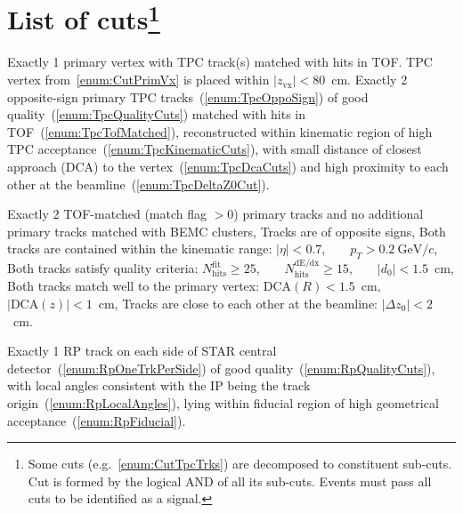 \section[List of cuts]{List of cuts\footnote{Some cuts (e.g.~\ref{enum:CutTpcTrks}) are decomposed to constituent sub-cuts. Cut is formed by the logical AND of all its sub-cuts. Events must pass all cuts to be identified as a signal.}}\label{sec:listOfCuts}
\begin{enumerate}[label=\textbf{C\arabic*},ref=C\arabic*]
 \itemm Exactly 1 primary vertex with TPC track(s) matched with hits in TOF.\label{enum:CutPrimVx}
 \itemm TPC vertex from~\ref{enum:CutPrimVx} is placed within $|z_{\text{vx}}|<80$~cm.\label{enum:CutZVx}
 \itemm Exactly 2 opposite-sign primary TPC tracks~(\ref{enum:TpcOppoSign}) of good quality~(\ref{enum:TpcQualityCuts}) matched with hits in TOF~(\ref{enum:TpcTofMatched}), reconstructed within kinematic region of high TPC acceptance~(\ref{enum:TpcKinematicCuts}), with small distance of closest approach (DCA) to the vertex~(\ref{enum:TpcDcaCuts}) and high proximity to each other at the beamline~(\ref{enum:TpcDeltaZ0Cut}).\label{enum:CutTpcTrks}
    \begin{enumerate}[label=\textbf{\theenumi.\arabic*},ref=\theenumi.\arabic*]
      \itemm Exactly 2 TOF-matched (match flag $>0$) primary tracks and no additional primary tracks matched with BEMC clusters,\label{enum:TpcTofMatched}
      \itemm Tracks are of opposite signs,\label{enum:TpcOppoSign}
      \itemm Both tracks are contained within the kinematic range:\label{enum:TpcKinematicCuts}\hspace*{13pt}
      $|\eta|<0.7$,~~~~$p_{T}>0.2~\text{GeV}/c$,
      \itemm Both tracks satisfy quality criteria:\label{enum:TpcQualityCuts}\hspace*{100pt}
      $N_{\text{hits}}^{\text{fit}}\geq25$,~~~~$N_{\text{hits}}^{\text{dE/dx}}\geq15$,~~~~$|d_{0}|<1.5$~cm,
      \itemm Both tracks match well to the primary vertex:\label{enum:TpcDcaCuts}\hspace*{47pt}
      $\text{DCA}(R)<1.5$~cm,~~~~$|\text{DCA}(z)|<1$~cm,
      \itemm Tracks are close to each other at the beamline:\label{enum:TpcDeltaZ0Cut}\hspace*{45pt}
      $|\Delta z_{0}|<2$~cm.
    \end{enumerate}
 \itemm Exactly 1 RP track on each side of STAR central detector~(\ref{enum:RpOneTrkPerSide}) of good quality~(\ref{enum:RpQualityCuts}), with local angles consistent with the IP being the track origin~(\ref{enum:RpLocalAngles}), lying within fiducial region of high geometrical acceptance~(\ref{enum:RpFiducial}).\label{enum:CutRpTrks}

\end{enumerate}
